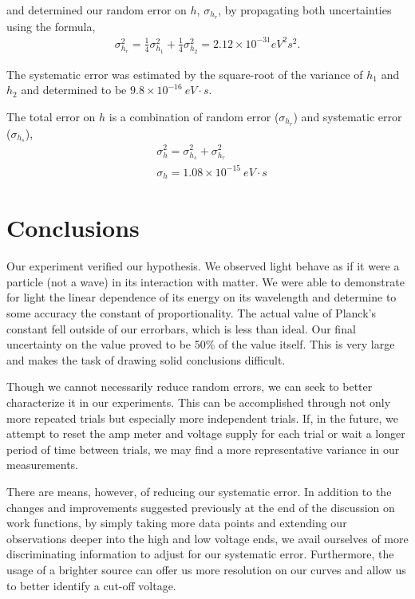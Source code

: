 \documentclass[aps,twocolumn,secnumarabic,nobalancelastpage,amsmath,amssymb,
nofootinbib]{revtex4}
\begin{document}
and determined our random error on $h$, $\sigma_{h_r}$, by propagating both uncertainties using the formula,
\begin{align}
\sigma_{h_r}^2 = \frac{1}{4} \sigma_{h_1}^2 +  \frac{1}{4} \sigma_{h_2}^2 = 2.12 \times 10^{-31} eV^2 s^2.
\end{align}

The systematic error was estimated by the square-root of the variance of $h_1$ and $h_2$ and determined to be $9.8 \times 10^{-16} ~eV \cdot s$.

The total error on $h$ is a combination of random error ($\sigma_{h_r}$) and systematic error ($\sigma_{h_s}$), 
\begin{align}
&\sigma_{h}^2 = \sigma_{h_s}^2 + \sigma_{h_r}^2 \\ \nonumber
&\sigma_{h} = 1.08 \times 10^{-15} ~eV \cdot s
\end{align}


\section{Conclusions}

Our experiment verified our hypothesis.  We observed light behave as if it were a particle (not a wave) in its interaction with matter.  We were able to demonstrate for light the linear dependence of its energy on its wavelength and determine to some accuracy the constant of proportionality.  The actual value of Planck's constant fell outside of our errorbars, which is less than ideal.  Our final uncertainty on the value proved to be 50\% of the value itself.  This is very large and makes the task of drawing solid conclusions difficult.  

Though we cannot necessarily reduce random errors, we can seek to better characterize it in our experiments.  This can be accomplished through not only more repeated trials but especially more independent trials.  If, in the future, we attempt to reset the amp meter and voltage supply for each trial or wait a longer period of time between trials, we may find a more representative variance in our measurements.

There are means, however, of reducing our systematic error.  In addition to the changes and improvements suggested previously at the end of the discussion on work functions, by simply taking more data points and extending our observations deeper into the high and low voltage ends, we avail ourselves of more discriminating information to adjust for our systematic error.  Furthermore, the usage of a brighter source can offer us more resolution on our curves and allow us to better identify a cut-off voltage.
\end{document}
